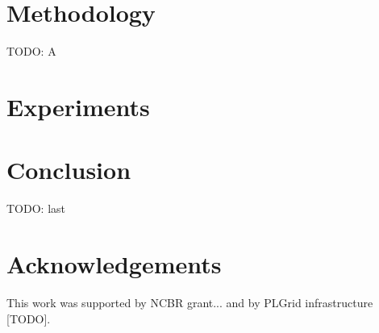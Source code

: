 \documentclass{IOS-Book-Article}
\theoremstyle{definition}
\begin{document}
\section{Methodology}
\label{sec:method}

TODO: A



\section{Experiments}
\label{sec:experiments}



\section{Conclusion}

TODO: last



\section*{Acknowledgements}

This work was supported by NCBR grant... and by PLGrid infrastructure [TODO].


\end{document}
